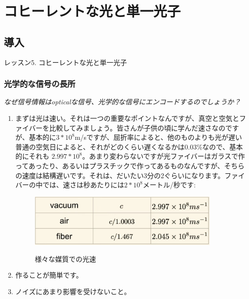 \chapter[コヒーレントな光と単一光子]
{コヒーレントな光と単一光子}



\section{導入}
レッスン5. コヒーレントな光と単一光子
\subsection{光学的な信号の長所}
\textit{なぜ信号情報はopticalな信号、光学的な信号にエンコードするのでしょうか？}
\begin{enumerate}
    \item まずは光は速い。それは一つの重要なポイントなんですが、真空と空気とファイバーを比較してみましょう。皆さんが子供の頃に学んだ速さなのですが、基本的に$3*10^{8}$m/sですが、屈折率によると、他のものよりも光が遅い普通の空気日によると、それがどのくらい遅くなるかは0.03\%なので、基本的にそれも
$2.997*10^{8}$。あまり変わらないですが光ファイバーはガラスで作ってあったり、あるいはプラスチックで作ってあるものなんですが、そちらの速度は結構遅いです。それは、だいたい3分の2ぐらいになります。ファイバーの中では、速さは秒あたりには$2*10^{8}$メートル/秒です:
\begin{figure}[H]
    \centering
    \includegraphics[width=0.9\textwidth]{lesson5/table_speeds.pdf}
    \label{図: 1}
    \caption{様々な媒質での光速}
\end{figure}
    \item 作ることが簡単です。
    \item ノイズにあまり影響を受けないこと。
\end{enumerate}
